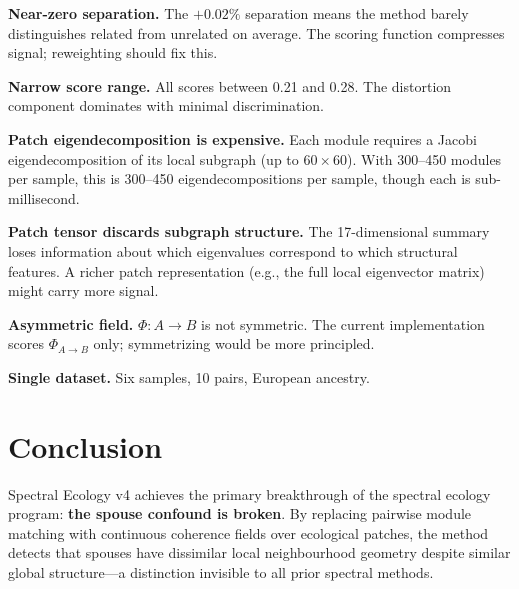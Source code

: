 \documentclass{../yalumba}
\begin{document}
\begin{limitation}
\textbf{Near-zero separation.}  The $+0.02\%$ separation means the method
barely distinguishes related from unrelated on average.  The scoring
function compresses signal; reweighting should fix this.
\end{limitation}

\begin{limitation}
\textbf{Narrow score range.}  All scores between 0.21 and 0.28.  The
distortion component dominates with minimal discrimination.
\end{limitation}

\begin{limitation}
\textbf{Patch eigendecomposition is expensive.}  Each module requires a
Jacobi eigendecomposition of its local subgraph (up to $60 \times 60$).
With 300--450 modules per sample, this is 300--450 eigendecompositions per
sample, though each is sub-millisecond.
\end{limitation}

\begin{limitation}
\textbf{Patch tensor discards subgraph structure.}  The 17-dimensional
summary loses information about which eigenvalues correspond to which
structural features.  A richer patch representation (e.g., the full local
eigenvector matrix) might carry more signal.
\end{limitation}

\begin{limitation}
\textbf{Asymmetric field.}  $\Phi: A \to B$ is not symmetric.  The
current implementation scores $\Phi_{A \to B}$ only; symmetrizing would
be more principled.
\end{limitation}

\begin{limitation}
\textbf{Single dataset.}  Six samples, 10 pairs, European ancestry.
\end{limitation}


\section{Conclusion}
\label{sec:conclusion}

Spectral Ecology v4 achieves the primary breakthrough of the spectral
ecology program: \textbf{the spouse confound is broken}.  By replacing
pairwise module matching with continuous coherence fields over ecological
patches, the method detects that spouses have dissimilar local neighbourhood
geometry despite similar global structure---a distinction invisible to all
prior spectral methods.
\end{document}
